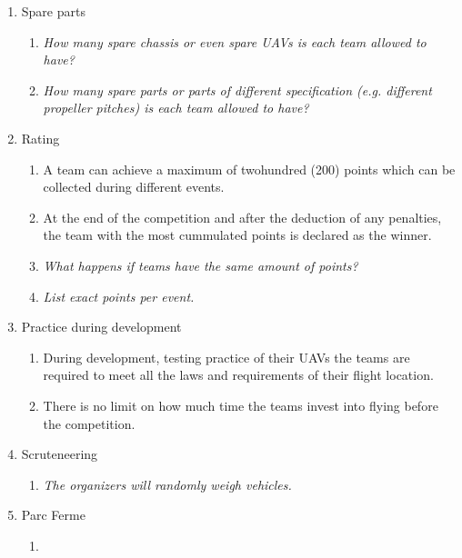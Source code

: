 \begin{enumerate}
    \item{Spare parts}
    \begin{enumerate}
      \item \emph{How many spare chassis or even spare UAVs is each team allowed to have?}
      \item \emph{How many spare parts or parts of different specification (e.g. different propeller pitches) is each team allowed to have?}
    \end{enumerate}

    \item{Rating}
    \begin{enumerate}
      \item A team can achieve a maximum of twohundred (200) points which can be collected during different events.
      \item At the end of the competition and after the deduction of any penalties, the team with the most cummulated points is declared as the winner. 
      \item \emph{What happens if teams have the same amount of points?}
      \item \emph{List exact points per event.}
    \end{enumerate}

    \item{Practice during development}
    \begin{enumerate}
      \item During development, testing practice of their UAVs the teams are required to meet all the laws and requirements of their flight location. 
      \item There is no limit on how much time the teams invest into flying before the competition. 
    \end{enumerate}

    \item{Scruteneering}
    \begin{enumerate}
      \item \emph{The organizers will randomly weigh vehicles.}
    \end{enumerate}

    \item{Parc Ferme}
    \begin{enumerate}
      \item 
    \end{enumerate}


\end{enumerate}
